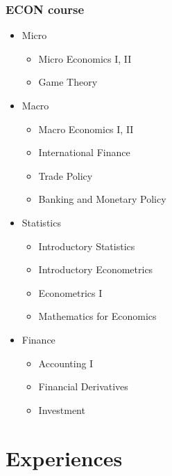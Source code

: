 \documentclass[compress, aspectratio=32]{beamer}
\begin{document}
\begin{frame}
    \frametitle{ECON course}
    \begin{multicols}{2}
        \begin{itemize}
            \item Micro
            \begin{itemize}
                \item Micro Economics I, II
                \item Game Theory
            \end{itemize}
            \item Macro
            \begin{itemize}
                \item Macro Economics I, II
                \item International Finance
                \item Trade Policy
                \item Banking and Monetary Policy
            \end{itemize}
            \item Statistics
            \begin{itemize}
                \item Introductory Statistics
                \item Introductory Econometrics
                \item Econometrics I
                \item Mathematics for Economics
            \end{itemize}
            \item Finance
            \begin{itemize}
                \item Accounting I
                \item Financial Derivatives
                \item Investment
            \end{itemize}
        \end{itemize}
    \end{multicols}
\end{frame}

\section{Experiences}
\end{document}
